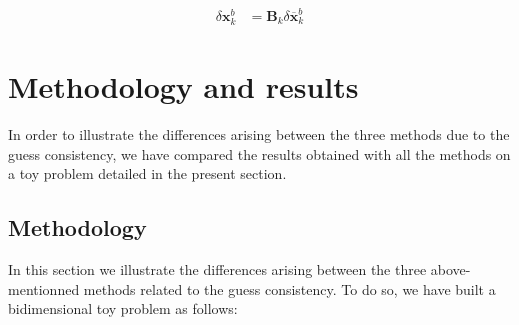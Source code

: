 \documentclass[npg, manuscript]{copernicus}
\begin{document}
\begin{align}
\label{eq:alternative_B}
\delta \mathbf{x}^b_k & = \mathbf{B}_k \delta \overline{\mathbf{x}}^b_k
\end{align}
\section{Methodology and results}
In order to illustrate the differences arising between the three methods due to the guess consistency, we have compared the results obtained with all the methods on a toy problem detailed in the present section.

\subsection{Methodology}
In this section we illustrate the differences arising between the three above-mentionned methods related to the guess consistency. To do so, we have built a bidimensional toy problem as follows:
\end{document}

